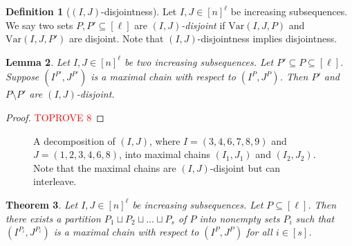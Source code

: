 \documentclass[11pt]{article}
\theoremstyle{plain}
\newtheorem{thm}{Theorem}
\newtheorem{lemma}[thm]{Lemma}
\theoremstyle{definition}
\newtheorem{defn}[thm]{Definition}
\theoremstyle{remark}
\newcommand{\var}{\mathrm{Var}}
\begin{document}
\begin{defn}[$(I,J)$-disjointness]\label{defn:disjointness}
Let $I,J\in[n]^\ell$ be increasing subsequences.
We say two sets $P,P'\subseteq [\ell]$ are \emph{$(I,J)$-disjoint} if $\var(I,J,P)$ and $\var(I,J,P')$ are disjoint. Note that $(I,J)$-disjointness implies disjointness.
\end{defn}

\begin{lemma}\label{lemma:disjointness}
Let $I,J\in[n]^{\ell}$ be two increasing subsequences.
Let $P'\subseteq P\subseteq [\ell]$. 
Suppose $(I^{P'}, J^{P'})$ is a maximal chain with respect to $(I^P,J^P)$.
Then $P'$ and $P\setminus P'$ are $(I,J)$-disjoint.
\end{lemma}
\begin{proof}\textcolor{red}{TOPROVE 8}\end{proof}
\begin{figure}
    \caption{A decomposition of $(I,J)$, where $I=(3,4,6,7,8,9)$ and $J=(1,2,3,4,6,8)$, into maximal chains $(I_1,J_1)$ and $(I_2,J_2)$. Note that the maximal chains are $(I,J)$-disjoint but can interleave.} 
    \label{fig:decomposition}
\end{figure}

\begin{thm}\label{thm:structure-general}
Let $I,J\in [n]^\ell$ be increasing subsequences.
Let $P\subseteq [\ell]$.
Then there exists a partition $P_1\sqcup P_2\sqcup \dots\sqcup P_s$ of $P$ into nonempty sets $P_i$ such that $(I^{P_i},J^{P_i})$ is a maximal chain with respect to $(I^P,J^P)$ for all $i\in[s]$. 
\end{thm}
\end{document}
